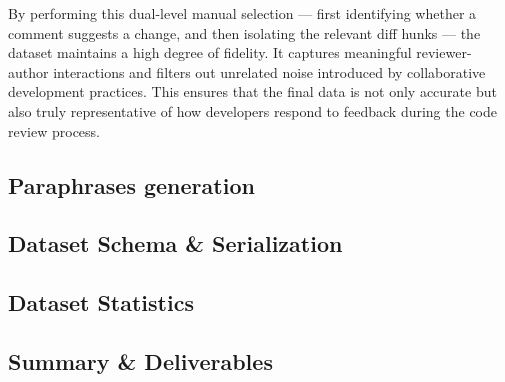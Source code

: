 By performing this dual-level manual selection — first identifying whether a comment suggests a
change, and then isolating the relevant diff hunks — the dataset maintains a high degree of
fidelity. It captures meaningful reviewer-author interactions and filters out unrelated noise
introduced by collaborative development practices. This ensures that the final data is not only
accurate but also truly representative of how developers respond to feedback during the code review
process.


\subsection{Paraphrases generation}
\subsection{Dataset Schema \& Serialization}
\subsection{Dataset Statistics}
\subsection{Summary \& Deliverables}
